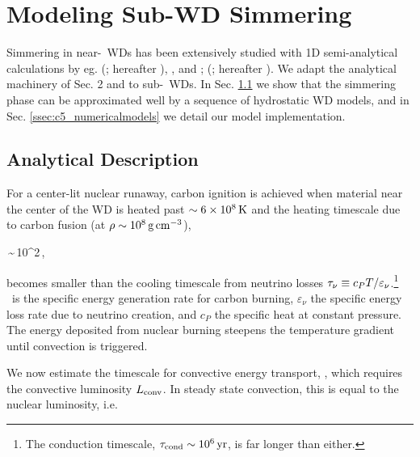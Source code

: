\section{Modeling Sub-\Mch WD Simmering}
\label{sec:c5_modelsim}

Simmering in near-\Mch\ WDs has been extensively studied with 1D semi-analytical calculations by eg. \citeauthor{wooswk04} (\citeyear{wooswk04}; hereafter \citeal{wooswk04}), \cite{lesa+06, piro08}, and \citeauthor{piroc08}; (\citeyear{piroc08}; hereafter \citeal{piroc08}).  We adapt the analytical machinery of \citeal{wooswk04} Sec. 2 and \citeal{piroc08} to sub-\Mch\ WDs.  In Sec. \ref{ssec:c5_simmer} we show that the simmering phase can be approximated well by a sequence of hydrostatic WD models, and in Sec. \ref{ssec:c5_numericalmodels} we detail our model implementation.

\subsection{Analytical Description}
\label{ssec:c5_simmer}


For a center-lit nuclear runaway, carbon ignition is achieved when material near the center of the WD is heated past $\sim 6 \times10^8\,\mathrm{K}$ and the heating timescale due to carbon fusion (at $\rho \sim 10^8\,\gcc$),

\eqbegin
\taucc \equiv {}\,\sim\,10^2\,,
\label{eq:c5_taucc}
\eqend

\noindent becomes smaller than the cooling timescale from neutrino losses $\taunu\equiv c_P T/\varepsilon_\nu$.\footnote{The conduction timescale, $\taucond \sim 10^6\,\mrm{yr}$, is far longer than either.}  \epscc\ is the specific energy generation rate for carbon burning, $\varepsilon_\nu$ the specific energy loss rate due to neutrino creation, and $c_P$ the specific heat at constant pressure.  The energy deposited from nuclear burning steepens the temperature gradient until convection is triggered.


We now estimate the timescale for convective energy transport, \tauconv, which requires the convective luminosity $\Lconv$.  In steady state convection, this is equal to the nuclear luminosity, i.e.


